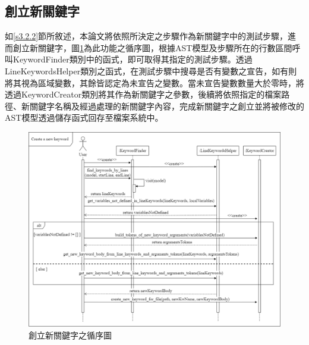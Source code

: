 \subsection{創立新關鍵字}\label{s4.4.1}
%
\indent
如\ref{s3.2.2}節所敘述，本論文將依照所決定之步驟作為新關鍵字中的測試步驟，進而創立新關鍵字，圖\ref{f4.4}為此功能之循序圖，根據AST模型及步驟所在的行數區間呼叫KeywordFinder類別中的函式，即可取得其指定的測試步驟。透過LineKeywordsHelper類別之函式，在測試步驟中搜尋是否有變數之宣告，如有則將其視為區域變數，其餘皆認定為未宣告之變數。當未宣告變數數量大於零時，將透過KeywordCreator類別將其作為新關鍵字之參數，後續將依照指定的檔案路徑、新關鍵字名稱及經過處理的新關鍵字內容，完成新關鍵字之創立並將被修改的AST模型透過儲存函式回存至檔案系統中。

\begin{figure}[H]
	\centering
    \includegraphics[width=1.0\textwidth]{picture/ch4/sequenceDiagram/Create_new_keyword_sequence_diagram.png}
    \caption{創立新關鍵字之循序圖}
    \label{f4.4}
\end{figure}
\newpage

